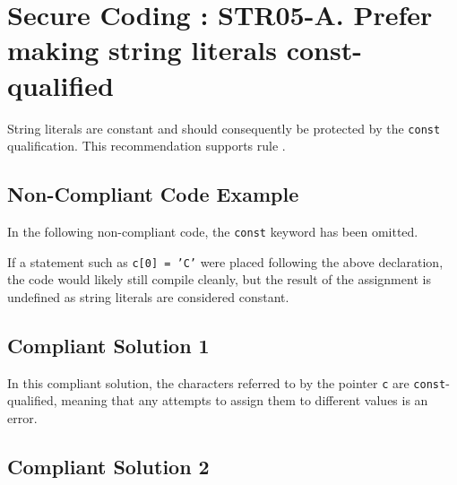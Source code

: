 
   \section{Secure Coding : STR05-A. Prefer making string literals const-qualified}

   String literals are constant and should consequently be protected by the {\tt const} qualification. This recommendation supports rule  .
   \subsection{Non-Compliant Code Example}

   In the following non-compliant code, the {\tt const} keyword has been omitted.


   If a statement such as {\tt c[0] = 'C'} were placed following the above declaration, the code would likely still compile cleanly, but the result of the assignment is undefined as string literals are considered constant.
   \subsection{Compliant Solution 1}

   In this compliant solution, the characters referred to by the pointer {\tt c} are {\tt const}-qualified, meaning that any attempts to assign them to different values is an error.

   \subsection{Compliant Solution 2}

